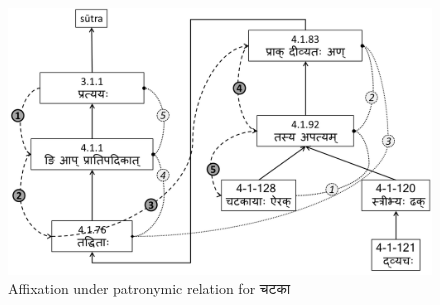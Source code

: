 \documentclass[a4paper,11pt,twoside,openright]{report}
\begin{document}
     
\begin{figure}[h] 
    \centering
	\includegraphics[width=\textwidth]{tadrule2}
    \caption{Affixation under patronymic relation for {\skt चटका}}
    \label{fig:tadrule}
\end{figure}
  
  
  
  
\\
\end{document}
